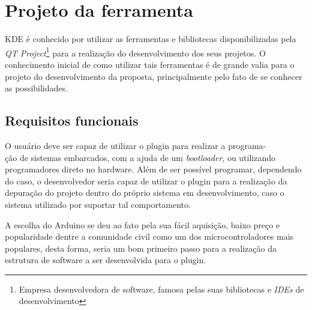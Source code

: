 \chapter{Projeto da ferramenta}

KDE é conhecido por utilizar as ferramentas e bibliotecas disponibilizadas pela \textit{QT Project}\footnote{Empresa desenvolvedora  de software, famosa pelas suas bibliotecas e \textit{IDEs} de desenvolvimento} para a realização do desenvolvimento dos seus projetos. O conhecimento inicial de como utilizar tais ferramentas é de grande valia para o projeto do desenvolvimento da proposta, principalmente pelo fato de se conhecer as possibilidades.


\section{Requisitos funcionais}

O usuário deve ser capaz de utilizar o plugin para realizar a programa-\\ção de sistemas embarcados, com a ajuda de um \textit{bootloader}, ou utilizando programadores direto no hardware. Além de ser possível programar, dependendo do caso, o desenvolvedor seria capaz de utilizar o plugin para a realização da depuração do projeto dentro do próprio sistema em desenvolvimento, caso o sistema utilizado por suportar tal comportamento.

A escolha do Arduino se deu ao fato pela sua fácil aquisição, baixo preço e popularidade dentre a comunidade civil como um dos microcontroladores mais populares, desta forma, seria um bom primeiro passo para a realização da estrutura de software a ser desenvolvida para o plugin.

